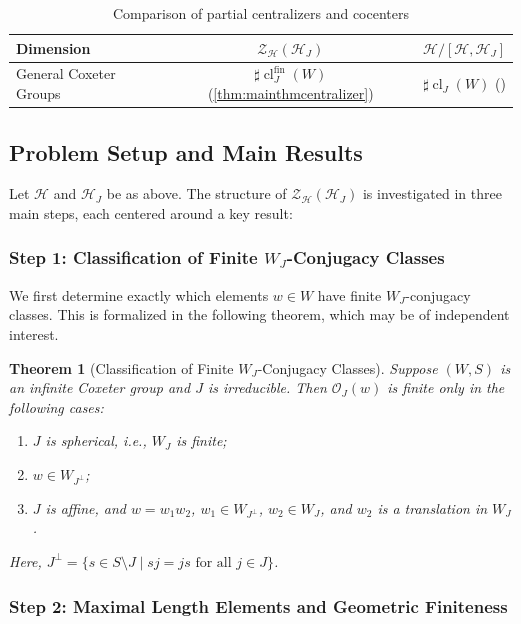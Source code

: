 \documentclass[a4paper, reqno, 14pt]{amsart}
\def\co{\mathcal{O}}
\def\ch{\mathcal{H}}
\DeclareMathOperator{\cl}{cl}
\newtheorem{namedthm}{Theorem}
\newenvironment{thmA}[1]{%
  \renewcommand\thenamedthm{#1}%
  \begin{namedthm}
}{%
  \end{namedthm}
}
\theoremstyle{definition}
\theoremstyle{remark}
\numberwithin{equation}{section}
\numberwithin{thm}{section}
\begin{document}
\begin{table}[h]
\centering
\begin{tabular}{|l|c|c|}
\hline
\textbf{Dimension} & \textbf{$\mathcal{Z}_{\mathcal{H}}(\mathcal{H}_J)$} & \textbf{$\mathcal{H}/[\mathcal{H}, \mathcal{H}_J]$} \\
\hline
General Coxeter Groups & $\sharp \cl_J^{\mathrm{fin}}(W)$ (\cref{thm:mainthmcentralizer}) & $\sharp \cl_J(W)$ (\cite{partialcocenterADLV}) \\
\hline
\end{tabular}
\caption{Comparison of partial centralizers and cocenters}
\end{table}

\subsection{Problem Setup and Main Results}

Let $\ch$ and $\ch_J$ be as above. The structure of $\mathcal{Z}_{\mathcal{H}}(\mathcal{H}_J)$ is investigated in three main steps, each centered around a key result:

\subsubsection*{Step 1: Classification of Finite $W_J$-Conjugacy Classes}

We first determine exactly which elements $w \in W$ have finite $W_J$-conjugacy classes. This is formalized in the following theorem, which may be of independent interest.

\begin{thmA}{A}[Classification of Finite $W_J$-Conjugacy Classes]
Suppose $(W,S)$ is an infinite Coxeter group and $J$ is irreducible. Then $\co_J(w)$ is finite only in the following cases:
\begin{enumerate}
    \item $J$ is spherical, i.e., $W_J$ is finite;
    \item $w \in W_{J^\perp}$;
    \item $J$ is affine, and $w = w_1 w_2$, $w_1 \in W_{J^\perp}$, $w_2 \in W_J$, and $w_2$ is a translation in $W_J$.
\end{enumerate}
Here, $J^\perp = \{ s \in S \setminus J \mid sj = js \text{ for all } j \in J \}$.
\end{thmA}

\subsubsection*{Step 2: Maximal Length Elements and Geometric Finiteness}
\end{document}
